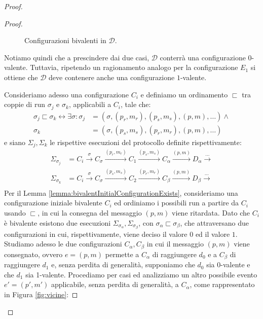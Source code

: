 \documentclass{article}
\begin{document}
\begin{proof}
\begin{proof}
\begin{figure}[h]
  \centering \caption{Configurazioni bivalenti
    in $\mathcal{D}$.}\label{fig:lemma3}
\end{figure}
\newpage

Notiamo quindi che a prescindere dai due casi, $\mathcal{D}$ conterrà
una configurazione $0$-valente. Tuttavia, ripetendo un ragionamento
analogo per la configurazione $E_1$ si ottiene che $\mathcal{D}$ deve
contenere anche una configurazione $1$-valente. 

Consideriamo adesso una configurazione $C_i$ e definiamo un
ordinamento $\sqsubset$ tra coppie di run $\sigma_{j}$ e $ \sigma_{k
}$, applicabili a $C_i$, tale che:
\begin{displaymath}
  \begin{split}
    \sigma_{j} \sqsubset \sigma_{k} \leftrightarrow \exists \sigma:
    \sigma_{j} &= (\sigma, (p_{r}, m_{r}), (p_{s}, m_{s}), (p,m),
    \ldots) \wedge \\ \sigma_{k}&= (\sigma, (p_{s}, m_{s}), (p_{r},
    m_{r}), (p,m), \ldots)
  \end{split}
\end{displaymath}
e siano $\Sigma_j, \Sigma_k$  le rispettive esecuzioni del
protocollo definite rispettivamente:
\begin{displaymath}
  \begin{split}
    \Sigma_{\sigma_{j}} &= C_i \xrightarrow{\sigma} C_{\sigma}
    \xrightarrow{(p_{r}, m_{r})}C_1 \xrightarrow{(p_{s},m_{s})}
    C_{\alpha} \xrightarrow{(p,m)} D_{\alpha} \xrightarrow{\ldots}\\
    \Sigma_{\sigma_{k}} &= C_i \xrightarrow{\sigma} C_{\sigma}
    \xrightarrow{(p_{s}, m_{s})}C_2 \xrightarrow{(p_{r},m_{r})}
    C_{\beta} \xrightarrow{(p,m)} D_{\beta} \xrightarrow{\ldots}\\
  \end{split}
\end{displaymath}
Per il Lemma \ref{lemma:bivalentInitialConfigurationExists},
consideriamo una configurazione iniziale bivalente $C_i$ ed ordiniamo
i possibili run a partire da $C_i$ usando $\sqsubset$, in cui la
consegna del messaggio $(p,m)$ viene ritardata. Dato che $C_i$ \`e
bivalente esistono due esecuzioni $\Sigma_{\sigma_{\alpha}},
\Sigma_{\sigma_{\beta}}$, con $\sigma_{\alpha} \sqsubset
\sigma_{\beta}$, che attraversano due configurazioni in cui,
rispettivamente, viene deciso il valore $0$ ed il valore $1$. Studiamo
adesso le due configurazioni $C_{\alpha}, C_{\beta}$ in cui il
messaggio $(p,m)$ viene consegnato, ovvero $e=(p,m)$ permette a
$C_\alpha$ di raggiungere $d_0$ e a $C_\beta$ di raggiungere $d_1$ e,
senza perdita di generalità, supponiamo che $d_0$ sia 0-valente e che
$d_1$ sia 1-valente. Procediamo per casi ed analizziamo un altro
possibile evento $e' = (p', m')$ applicabile, senza perdita di
generalit\`a, a $C_{\alpha}$, come rappresentato in Figura
\ref{fig:vicine}:




\end{proof}
\end{proof}
\end{document}
